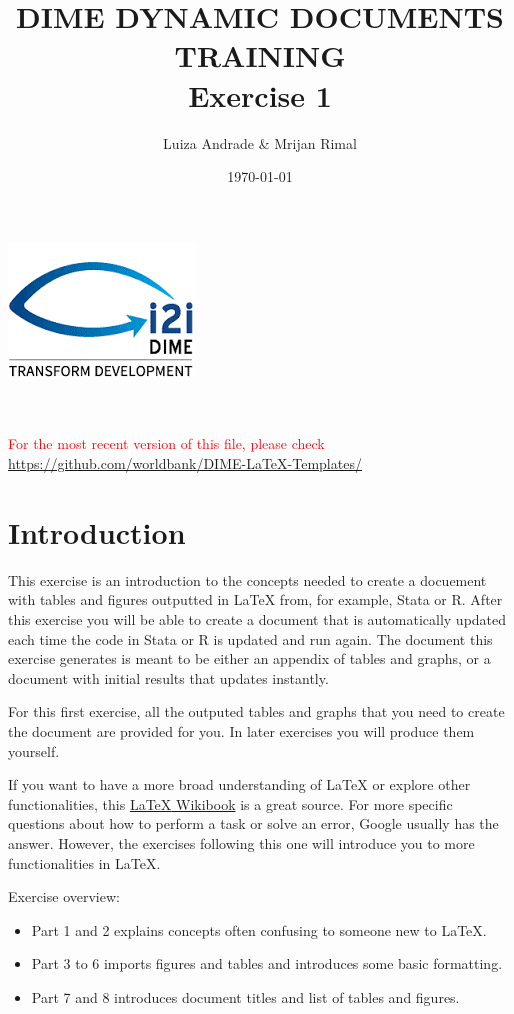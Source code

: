 \documentclass[12pts]{article}
\title{DIME DYNAMIC DOCUMENTS TRAINING \\ Exercise 1}
\author{Luiza Andrade \& Mrijan Rimal}
\date{\today}
\begin{document}
	
	
	\makeatletter
	\begin{titlepage}
		\begin{center}
			\includegraphics[width=0.3\linewidth]{../img/i2i.png}\\[10ex]
			{\LARGE \bfseries  \@title }\\[2ex] 
			{\Large  \@author}\\[20ex] 
			{\large \@date}
		\end{center}
		\vspace{5cm}
		\textcolor{red}{For the most recent version of this file, please check \url{https://github.com/worldbank/DIME-LaTeX-Templates/}}
	\end{titlepage}
	\makeatother
	
	\tableofcontents
	
	\newpage
	\section*{Introduction}
	This exercise is an introduction to the concepts needed to create a docuement with tables and figures outputted in {\LaTeX} from, for example, Stata or R. After this exercise you will be able to create a document that is automatically updated each time the code in Stata or R is updated and run again. The document this exercise generates is meant to be either an appendix of tables and graphs, or a document with initial results that updates instantly.
	
	For this first exercise, all the outputed tables and graphs that you need to create the document are provided for you. In later exercises you will produce them yourself.
	
	If you want to have a more broad understanding of {\LaTeX} or explore other functionalities, this \href{https://en.wikibooks.org/wiki/LaTeX
	}{{\LaTeX} Wikibook} is a great source. For more specific questions about how to perform a task or solve an error, Google usually has the answer. However, the exercises following this one will introduce you to more functionalities in {\LaTeX}.
	
	Exercise overview:
	\begin{itemize}
		\item Part 1 and 2 explains concepts often confusing to someone new to {\LaTeX}.
		\item Part 3 to 6 imports figures and tables and introduces some basic formatting.
		\item Part 7 and 8 introduces document titles and list of tables and figures.
	\end{itemize}
	
\end{document}
